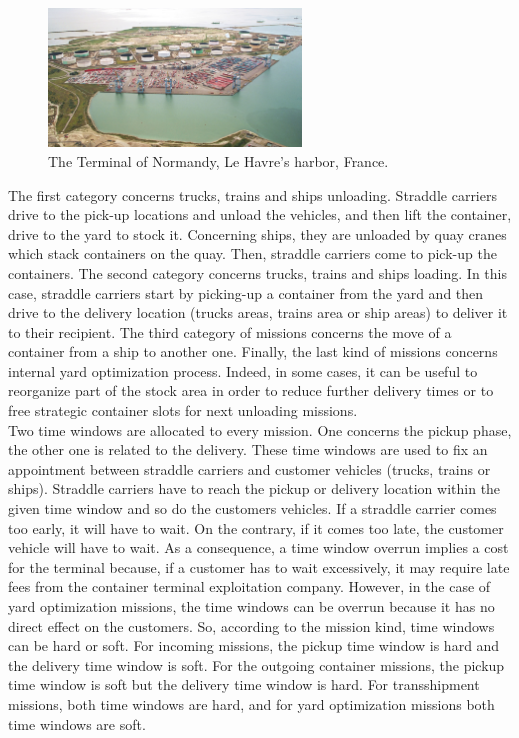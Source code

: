 \documentclass[a4paper,10pt]{article}
\begin{document}
\begin{figure}[ht]
  \begin{center}
  \includegraphics[width=0.6\textwidth]{Figures/terminalOfNormandy}
  \caption{The Terminal of Normandy, Le Havre's harbor, France.}
\end{center}
\end{figure}


The first category concerns trucks, trains and ships unloading. Straddle carriers drive to the pick-up locations and unload the vehicles, and then lift the container, drive to the yard to stock it. Concerning ships, they are unloaded by quay cranes which stack containers on the quay. Then, straddle carriers come to pick-up the containers.
The second category concerns trucks, trains and ships loading. In this case, straddle carriers start by picking-up a container from the yard and then drive to the delivery location (trucks areas, trains area or ship areas) to deliver it to their recipient. 
The third category of missions concerns the move of a container from a ship to another one.
Finally, the last kind of missions concerns internal yard optimization process. Indeed, in some cases, it can be useful to reorganize part of the stock area in order to reduce further delivery times or to free strategic container slots for next unloading missions.\\

Two time windows are allocated to every mission. One concerns the pickup phase, the other one is related to the delivery. These time windows are used to fix an appointment between straddle carriers and customer vehicles (trucks, trains or ships). Straddle carriers have to reach the pickup or delivery location within the given time window and so do the customers vehicles. If a straddle carrier comes too early, it will have to wait. On the contrary, if it comes too late, the customer vehicle will have to wait. As a consequence, a time window overrun implies a cost for the terminal because, if a customer has to wait excessively, it may require late fees from the container terminal exploitation company. However, in the case of yard optimization missions, the time windows can be overrun because it has no direct effect on the customers. So, according to the mission kind, time windows can be hard or soft. For incoming missions, the pickup time window is hard and the delivery time window is soft. For the outgoing container missions, the pickup time window is soft but the delivery time window is hard. For transshipment missions, both time windows are hard, and for yard optimization missions both time windows are soft. 
\end{document}
